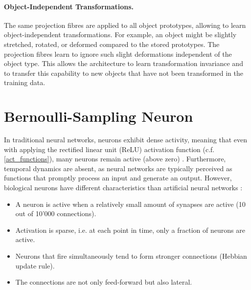 \paragraph{Object-Independent Transformations.} The same projection fibres are applied to all object prototypes, allowing to learn object-independent transformations. For example, an object might be slightly stretched, rotated, or deformed compared to the stored prototypes. The projection fibres learn to ignore such slight deformations independent of the object type. This allows the architecture to learn transformation invariance and to transfer this capability to new objects that have not been transformed in the training data.



















\section{Bernoulli-Sampling Neuron}
In traditional neural networks, neurons exhibit dense activity, meaning that even with applying the rectified linear unit (ReLU) activation function (c.f. \eqref{act_functions}), many neurons remain active (above zero) . Furthermore, temporal dynamics are absent, as neural networks are typically perceived as functions that promptly process an input and generate an output. However, biological neurons have different characteristics than artificial neural networks :

\begin{itemize}
    \item A neuron is active when a relatively small amount of synapses are active (10 out of 10'000 connections). 
    \item Activation is sparse, i.e. at each point in time, only a fraction of neurons are active.
    \item Neurons that fire simultaneously tend to form stronger connections (Hebbian update rule).
    \item The connections are not only feed-forward but also lateral.
\end{itemize}

